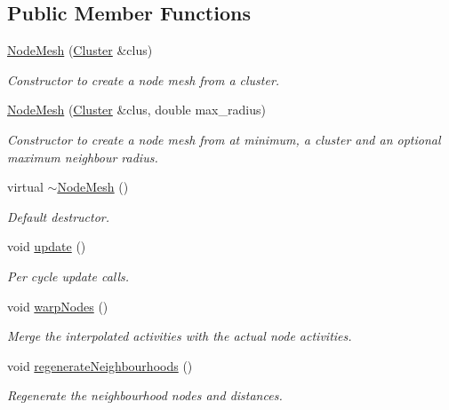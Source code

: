\subsection*{\-Public \-Member \-Functions}
\begin{DoxyCompactItemize}
\item 
\hyperlink{classcryomesh_1_1structures_1_1NodeMesh_a3cd9e7d377076d678de79401650c492d}{\-Node\-Mesh} (\hyperlink{classcryomesh_1_1structures_1_1Cluster}{\-Cluster} \&clus)
\begin{DoxyCompactList}\small\item\em \-Constructor to create a node mesh from a cluster. \end{DoxyCompactList}\item 
\hyperlink{classcryomesh_1_1structures_1_1NodeMesh_ac7846a95811e38ae6a89cb74e4acbe26}{\-Node\-Mesh} (\hyperlink{classcryomesh_1_1structures_1_1Cluster}{\-Cluster} \&clus, double max\-\_\-radius)
\begin{DoxyCompactList}\small\item\em \-Constructor to create a node mesh from at minimum, a cluster and an optional maximum neighbour radius. \end{DoxyCompactList}\item 
virtual \hyperlink{classcryomesh_1_1structures_1_1NodeMesh_a3a40ab73f5130b83215bfd8f72d95eb4}{$\sim$\-Node\-Mesh} ()
\begin{DoxyCompactList}\small\item\em \-Default destructor. \end{DoxyCompactList}\item 
void \hyperlink{classcryomesh_1_1structures_1_1NodeMesh_a56acee3ddfaa6aad8cfcf4f135c18661}{update} ()
\begin{DoxyCompactList}\small\item\em \-Per cycle update calls. \end{DoxyCompactList}\item 
void \hyperlink{classcryomesh_1_1structures_1_1NodeMesh_a746174aeb591281f713a751b1eed25da}{warp\-Nodes} ()
\begin{DoxyCompactList}\small\item\em \-Merge the interpolated activities with the actual node activities. \end{DoxyCompactList}\item 
void \hyperlink{classcryomesh_1_1structures_1_1NodeMesh_ac3a3cada093a0114fe6eb1e8172f388b}{regenerate\-Neighbourhoods} ()
\begin{DoxyCompactList}\small\item\em \-Regenerate the neighbourhood nodes and distances. \end{DoxyCompactList}\item 

\end{DoxyCompactItemize}
